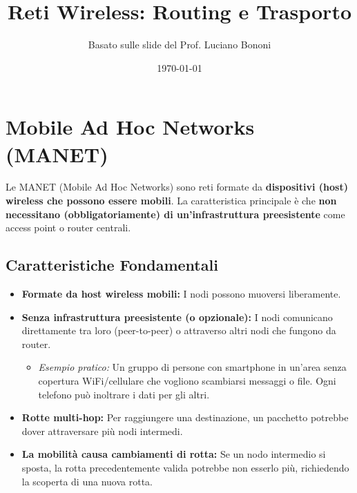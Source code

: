 

\title{Reti Wireless: Routing e Trasporto}
\author{Basato sulle slide del Prof. Luciano Bononi}
\date{\today}



\maketitle
\tableofcontents
\newpage

\section{Mobile Ad Hoc Networks (MANET)}

Le MANET (Mobile Ad Hoc Networks) sono reti formate da \textbf{dispositivi (host) wireless che possono essere mobili}. La caratteristica principale è che \textbf{non necessitano (obbligatoriamente) di un'infrastruttura preesistente} come access point o router centrali.

\subsection{Caratteristiche Fondamentali}
\begin{itemize}
    \item \textbf{Formate da host wireless mobili:} I nodi possono muoversi liberamente.
    \item \textbf{Senza infrastruttura preesistente (o opzionale):} I nodi comunicano direttamente tra loro (peer-to-peer) o attraverso altri nodi che fungono da router.
        \begin{itemize}
            \item \textit{Esempio pratico:} Un gruppo di persone con smartphone in un'area senza copertura WiFi/cellulare che vogliono scambiarsi messaggi o file. Ogni telefono può inoltrare i dati per gli altri.
        \end{itemize}
    \item \textbf{Rotte multi-hop:} Per raggiungere una destinazione, un pacchetto potrebbe dover attraversare più nodi intermedi.
    \item \textbf{La mobilità causa cambiamenti di rotta:} Se un nodo intermedio si sposta, la rotta precedentemente valida potrebbe non esserlo più, richiedendo la scoperta di una nuova rotta.
\end{itemize}

